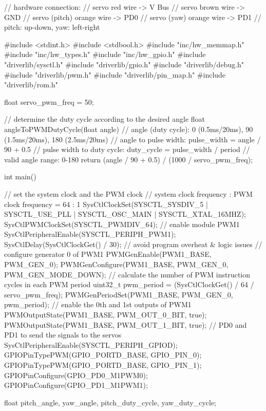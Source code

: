 \documentclass[12pt, a4paper]{article}
\begin{document}
\begin{code}
// hardware connection:
// servo red wire -> V Bus
// servo brown wire -> GND
// servo (pitch) orange wire -> PD0
// servo (yaw) orange wire -> PD1
// pitch: up-down, yaw: left-right

#include <stdint.h>
#include <stdbool.h>
#include "inc/hw_memmap.h"
#include "inc/hw_types.h"
#include "inc/hw_gpio.h"
#include "driverlib/sysctl.h"
#include "driverlib/gpio.h"
#include "driverlib/debug.h"
#include "driverlib/pwm.h"
#include "driverlib/pin_map.h"
#include "driverlib/rom.h"

float servo_pwm_freq = 50;

// determine the duty cycle according to the desired angle
float angleToPWMDutyCycle(float angle)
{
    // angle (duty cycle): 0 (0.5ms/20ms), 90 (1.5ms/20ms), 180 (2.5ms/20ms)
    // angle to pulse width: pulse_width = angle / 90 + 0.5
    // pulse width to duty cycle: duty_cycle = pulse_width / period
    // valid angle range: 0-180
    return (angle / 90 + 0.5) / (1000 / servo_pwm_freq);
}

int main()
{
    // set the system clock and the PWM clock
    // system clock frequency : PWM clock frequency = 64 : 1
    SysCtlClockSet(SYSCTL_SYSDIV_5 | SYSCTL_USE_PLL | SYSCTL_OSC_MAIN | SYSCTL_XTAL_16MHZ);
    SysCtlPWMClockSet(SYSCTL_PWMDIV_64);
    // enable module PWM1
    SysCtlPeripheralEnable(SYSCTL_PERIPH_PWM1);
    SysCtlDelay(SysCtlClockGet() / 30); // avoid program overheat & logic issues
    // configure generator 0 of PWM1
    PWMGenEnable(PWM1_BASE, PWM_GEN_0);
    PWMGenConfigure(PWM1_BASE, PWM_GEN_0, PWM_GEN_MODE_DOWN);
    // calculate the number of PWM instruction cycles in each PWM period
    uint32_t pwm_period = (SysCtlClockGet() / 64 / servo_pwm_freq);
    PWMGenPeriodSet(PWM1_BASE, PWM_GEN_0, pwm_period);
    // enable the 0th and 1st outputs of PWM1
    PWMOutputState(PWM1_BASE, PWM_OUT_0_BIT, true);
    PWMOutputState(PWM1_BASE, PWM_OUT_1_BIT, true);
    // PD0 and PD1 to send the signals to the servos
    SysCtlPeripheralEnable(SYSCTL_PERIPH_GPIOD);
    GPIOPinTypePWM(GPIO_PORTD_BASE, GPIO_PIN_0);
    GPIOPinTypePWM(GPIO_PORTD_BASE, GPIO_PIN_1);
    GPIOPinConfigure(GPIO_PD0_M1PWM0);
    GPIOPinConfigure(GPIO_PD1_M1PWM1);

    float pitch_angle, yaw_angle, pitch_duty_cycle, yaw_duty_cycle;

}
\end{code}
\end{document}
